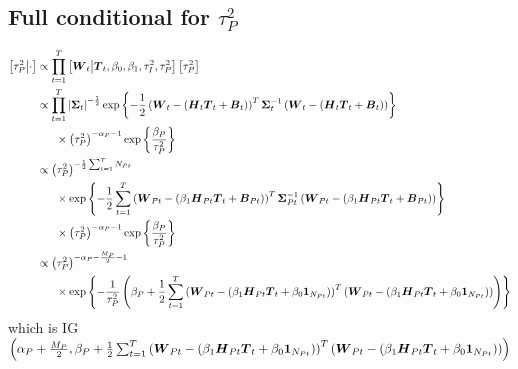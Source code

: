 \documentclass{article}\usepackage[]{graphicx}\usepackage[]{color}
\def\bm#1{\mbox{\boldmath $#1$}}
\begin{document}
\subsection{Full conditional for $\tau^2_P$}
%
\begin{align*}
%
\left[ \tau^2_P \middle| \cdot \right] & \propto \prod_{t = 1}^T \left[ \bm{W}_t \middle| \bm{T}_t, \beta_0, \beta_1, \tau^2_I, \tau^2_P \right] \left[ \tau^2_P \right] \\
%
& \propto \prod_{t = 1}^T \left| \bm{\Sigma}_t \right|^{ - \frac{1} {2}} \exp{ \left\{ - \frac{1} {2} \left( \bm{W}_t - \left( \bm{H}_t \bm{T}_t + \bm{B}_t \right) \right)^T \bm{\Sigma}_t^{ - 1} \left( \bm{W}_t - \left( \bm{H}_t \bm{T}_t + \bm{B}_t \right) \right) \right\} }\\
& \hspace{6mm} \times \left( \tau^2_P \right)^{ - \alpha_P - 1 } \exp{ \left\{ \frac{\beta_P} {\tau^2_P} \right\} }\\
%
& \propto \left( \tau^2_P \right)^{ - \frac{1} {2} \sum_{t = 1}^T N_{Pt}}\\
& \hspace{6mm} \times \exp{ \left\{ - \frac{1} {2} \sum_{t = 1}^T \left( \bm{W}_{Pt} - \left( \beta_1 \bm{H}_{Pt} \bm{T}_t + \bm{B}_{Pt} \right) \right)^T \bm{\Sigma}_{Pt}^{ - 1} \left( \bm{W}_{Pt} - \left( \beta_1 \bm{H}_{Pt} \bm{T}_t + \bm{B}_{Pt} \right) \right) \right\} }\\
& \hspace{6mm} \times \left( \tau^2_P \right)^{ - \alpha_P - 1 } \exp{ \left\{ \frac{\beta_P} {\tau^2_P} \right\} }\\
%
& \propto \left( \tau^2_P \right)^{ - \alpha_P - \frac{M_P} {2} - 1 }\\
& \hspace{6mm} \times \exp{ \left\{ - \frac{1} {\tau^2_P} \left( \beta_P + \frac{1} {2} \sum_{t = 1}^T \left( \bm{W}_{Pt} - \left( \beta_1 \bm{H}_{Pt} \bm{T}_t + \beta_0 \bm{1}_{N_{Pt}} \right) \right)^T \left( \bm{W}_{Pt} - \left( \beta_1 \bm{H}_{Pt} \bm{T}_t  + \beta_0 \bm{1}_{N_{Pt}} \right) \right) \right) \right\} }\\
%
\end{align*}
%
which is IG$\left( \alpha_P + \frac{M_P} {2}, \beta_P + \frac{1} {2} \sum_{t = 1}^T \left( \bm{W}_{Pt} - \left( \beta_1 \bm{H}_{Pt} \bm{T}_t  + \beta_0 \bm{1}_{N_{Pt}} \right) \right)^T \left( \bm{W}_{Pt} - \left( \beta_1 \bm{H}_{Pt} \bm{T}_t  + \beta_0 \bm{1}_{N_{Pt}} \right) \right) \right)$
%
%
\end{document}
